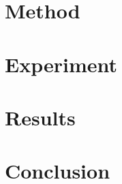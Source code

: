\documentclass[runningheads]{llncs}
\begin{document}
\section{Method}


\section{Experiment}


\section{Results}
\label{sec:result}


\section{Conclusion}


{\small


}
% 

%
%
%
% 
% 
%




\end{document}
